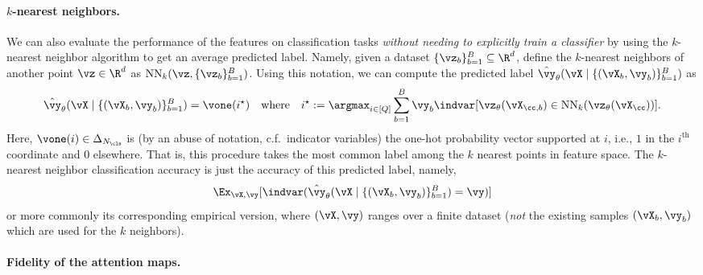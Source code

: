 \documentclass[../../book-main.tex]{subfiles}
\begin{document}
\paragraph{\(k\)-nearest neighbors.}  We can also evaluate the performance of the features on classification tasks \textit{without needing to explicitly train a classifier} by using the \(k\)-nearest neighbor algorithm to get an average predicted label. Namely, given a dataset \(\{\vz_{b}\}_{b = 1}^{B} \subseteq \R^{d}\), define the \(k\)-nearest neighbors of another point \(\vz \in \R^{d}\) as \(\operatorname{NN}_{k}(\vz, \{\vz_{b}\}_{b = 1}^{B})\). Using this notation, we can compute the predicted label \(\hat{\vy}_{\theta}(\vX \mid \{(\vX_{b}, \vy_{b})\}_{b = 1}^{B})\) as 
\begin{equation}
    \hat{\vy}_{\theta}(\vX \mid \{(\vX_{b}, \vy_{b})\}_{b = 1}^{B}) = \vone(i^{\star}) \quad \text{where} \quad i^{\star} := \argmax_{i \in [Q]}\sum_{b = 1}^{B}\vy_{b}\indvar[\vz_{\theta}(\vX_{\cc, b}) \in \operatorname{NN}_{k}(\vz_{\theta}(\vX_{\cc}))].
\end{equation}
Here, \(\vone(i) \in \Delta_{N_{\cls}}\) is (by an abuse of notation, c.f.~indicator variables) the one-hot probability vector supported at \(i\), i.e., \(1\) in the \(i^{\mathrm{th}}\) coordinate and \(0\) elsewhere. That is, this procedure takes the most common label among the \(k\) nearest points in feature space. The \(k\)-nearest neighbor classification accuracy is just the accuracy of this predicted label, namely,
\begin{equation}
    \Ex_{\vX, \vy}[\indvar(\hat{\vy}_{\theta}(\vX \mid \{(\vX_{b}, \vy_{b})\}_{b = 1}^{B}) = \vy)]
\end{equation}
or more commonly its corresponding empirical version, where \((\vX, \vy)\) ranges over a finite dataset (\textit{not} the existing samples \((\vX_{b}, \vy_{b})\) which are used for the \(k\) neighbors).

\paragraph{Fidelity of the attention maps.}
\end{document}
